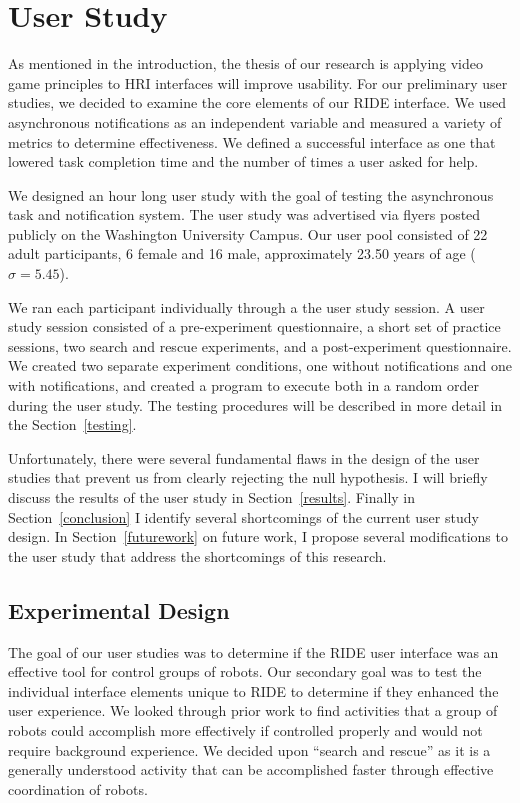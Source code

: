 \chapter{User Study}
As mentioned in the introduction, the thesis of our research is applying video game principles to HRI interfaces will improve usability. For our preliminary user studies, we decided to examine the core elements of our RIDE interface. We used asynchronous notifications as an independent variable and measured a variety of metrics to determine effectiveness. We defined a successful interface as one that lowered task completion time and the number of times a user asked for help.

We designed an hour long user study with the goal of testing the asynchronous task and notification system. The user study was advertised via flyers posted publicly on the Washington University Campus. Our user pool consisted of 22 adult participants, 6 female and 16 male, approximately 23.50 years of age ($\sigma=5.45$).

We ran each participant individually through a the user study session. A user study session consisted of a pre-experiment questionnaire, a short set of practice sessions, two search and rescue experiments, and a post-experiment questionnaire. We created two separate experiment conditions, one without notifications and one with notifications, and created a program to execute both in a random order during the user study. The testing procedures will be described in more detail in the Section~\ref{testing}.

Unfortunately, there were several fundamental flaws in the design of the user studies that prevent us from clearly rejecting the null hypothesis. I will briefly discuss the results of the user study in Section~\ref{results}. Finally in Section~\ref{conclusion} I identify several shortcomings of the current user study design. In Section~\ref{futurework} on future work, I propose several modifications to the user study that address the shortcomings of this research.

\section{Experimental Design}
The goal of our user studies was to determine if the RIDE user interface was an effective tool for control groups of robots. Our secondary goal was to test the individual interface elements unique to RIDE to determine if they enhanced the user experience. We looked through prior work to find activities that a group of robots could accomplish more effectively if controlled properly and would not require background experience. We decided upon ``search and rescue'' as it is a generally understood activity that can be accomplished faster through effective coordination of robots. 

